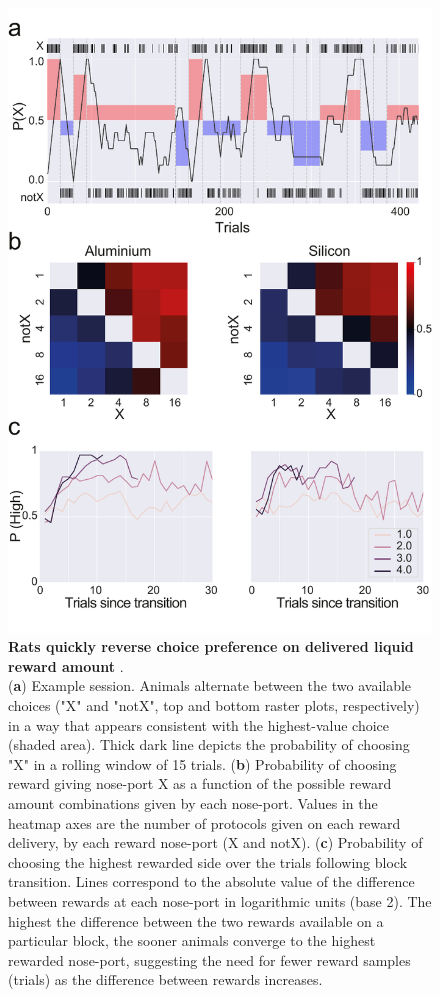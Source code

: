 \begin{figure}[ht] 
	\centering
	\includegraphics[width=0.8\linewidth]{Figures/Artboard 9.pdf}
	\caption{\textbf{Rats quickly reverse choice preference on delivered liquid reward amount }.\\
		(\textbf{a}) Example session. Animals alternate between the two available choices ("X" and "notX", top and bottom raster plots, respectively) in a way that appears consistent with the highest-value choice (shaded area). Thick dark line depicts the probability of choosing "X" in a rolling window of 15 trials. (\textbf{b}) Probability of choosing reward giving nose-port X as a function of the possible reward amount combinations given by each nose-port. Values in the heatmap axes are the number of protocols given on each reward delivery, by each reward nose-port (X and notX). (\textbf{c}) Probability of choosing the highest rewarded side over the trials following block transition. Lines correspond to the absolute value of the difference between rewards at each nose-port in logarithmic units (base 2). The highest the difference between the two rewards available on a particular block, the sooner animals converge to the highest rewarded nose-port, suggesting the need for fewer reward samples (trials) as the difference between rewards increases. }
	\label{fig:Behavior} 
\end{figure}

